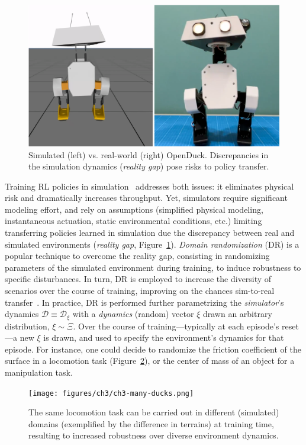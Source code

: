 \begin{figure}
    \centering
    \includegraphics[width=0.7\linewidth]{figures/ch3/ch3-duck-sim-vs-real.png}
    \caption{Simulated (left) vs. real-world (right) OpenDuck. Discrepancies in the simulation dynamics (\emph{reality gap}) pose risks to policy transfer.}
    \label{fig:synthetic-vs-real-duck}
\end{figure}

Training RL policies in simulation~\citep{tobinDomainRandomizationTransferring2017} addresses both issues: it eliminates physical risk and dramatically increases throughput.
Yet, simulators require significant modeling effort, and rely on assumptions (simplified physical modeling, instantaneous actuation, static environmental conditions, etc.) limiting transferring policies learned in simulation due the discrepancy between real and simulated environments (\emph{reality gap}, Figure~\ref{fig:synthetic-vs-real-duck}).
\emph{Domain randomization} (DR) is a popular technique to overcome the reality gap, consisting in randomizing parameters of the simulated environment during training, to induce robustness to specific disturbances.
In turn, DR is employed to increase the diversity of scenarios over the course of training, improving on the chances sim-to-real transfer~\citep{akkayaSolvingRubiksCube2019,antonovaReinforcementLearningPivoting2017,jiDribbleBotDynamicLegged2023}.
In practice, DR is performed further parametrizing the \emph{simulator}'s dynamics \( \mathcal D \equiv \mathcal D_\xi \) with a \emph{dynamics} (random) vector \( \xi \) drawn an arbitrary distribution, \( \xi \sim \Xi \).
Over the course of training---typically at each episode's reset---a new \( \xi \) is drawn, and used to specify the environment's dynamics for that episode.
For instance, one could decide to randomize the friction coefficient of the surface in a locomotion task (Figure~\ref{fig:ducks-on-terrains}), or the center of mass of an object for a manipulation task.

\begin{figure}
    \centering
    \texttt{[image: figures/ch3/ch3-many-ducks.png]}
    \caption{The same locomotion task can be carried out in different (simulated) domains (exemplified by the difference in terrains) at training time, resulting to increased robustness over diverse environment dynamics.}
    \label{fig:ducks-on-terrains}
\end{figure}

